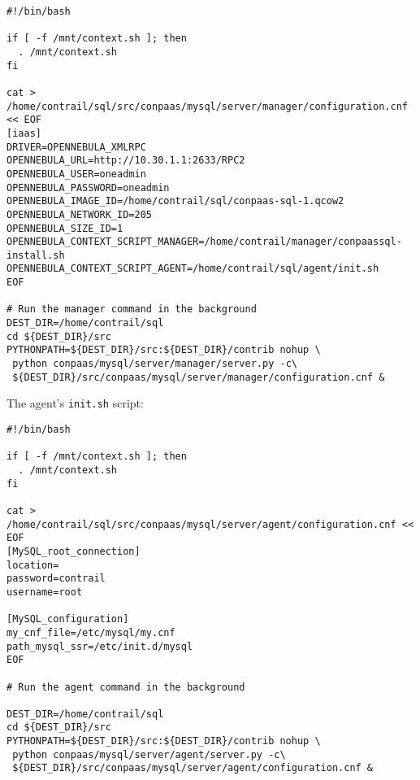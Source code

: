 \documentclass[a4paper,10pt]{article}
\begin{document}
\begin{Verbatim}[frame=single]
#!/bin/bash
 
if [ -f /mnt/context.sh ]; then
  . /mnt/context.sh
fi
 
cat > /home/contrail/sql/src/conpaas/mysql/server/manager/configuration.cnf << EOF
[iaas]
DRIVER=OPENNEBULA_XMLRPC
OPENNEBULA_URL=http://10.30.1.1:2633/RPC2
OPENNEBULA_USER=oneadmin
OPENNEBULA_PASSWORD=oneadmin
OPENNEBULA_IMAGE_ID=/home/contrail/sql/conpaas-sql-1.qcow2
OPENNEBULA_NETWORK_ID=205
OPENNEBULA_SIZE_ID=1
OPENNEBULA_CONTEXT_SCRIPT_MANAGER=/home/contrail/manager/conpaassql-install.sh
OPENNEBULA_CONTEXT_SCRIPT_AGENT=/home/contrail/sql/agent/init.sh
EOF

# Run the manager command in the background
DEST_DIR=/home/contrail/sql
cd ${DEST_DIR}/src
PYTHONPATH=${DEST_DIR}/src:${DEST_DIR}/contrib nohup \
 python conpaas/mysql/server/manager/server.py -c\
 ${DEST_DIR}/src/conpaas/mysql/server/manager/configuration.cnf &

\end{Verbatim}

\newpage
\vspace{4mm}

The agent's {\tt init.sh} script:

\begin{Verbatim}[frame=single]
#!/bin/bash
 
if [ -f /mnt/context.sh ]; then
  . /mnt/context.sh
fi
 
cat >  /home/contrail/sql/src/conpaas/mysql/server/agent/configuration.cnf << EOF
[MySQL_root_connection]
location=
password=contrail
username=root

[MySQL_configuration]
my_cnf_file=/etc/mysql/my.cnf
path_mysql_ssr=/etc/init.d/mysql
EOF

# Run the agent command in the background

DEST_DIR=/home/contrail/sql
cd ${DEST_DIR}/src
PYTHONPATH=${DEST_DIR}/src:${DEST_DIR}/contrib nohup \
 python conpaas/mysql/server/agent/server.py -c\
 ${DEST_DIR}/src/conpaas/mysql/server/agent/configuration.cnf &

\end{Verbatim}

\newpage
\vspace{4mm}
\end{document}
